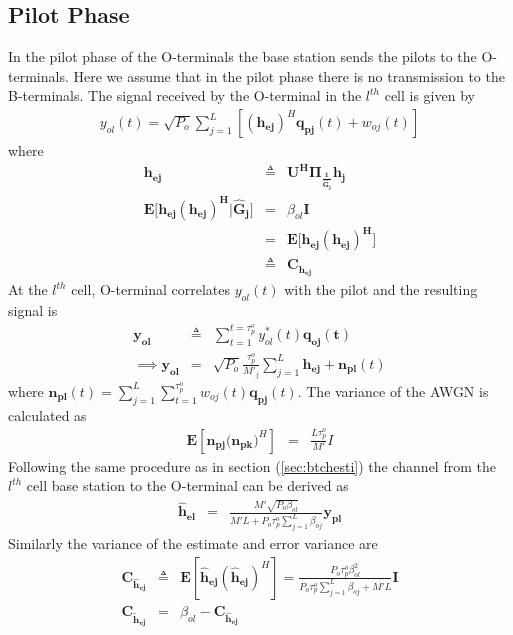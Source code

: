 \documentclass[10pt, a4paper, twoside,fleqn]{article}
\begin{document}
\subsection{Pilot Phase}
	In the pilot phase of the O-terminals the base station sends the pilots to the O-terminals. Here we assume that in the pilot phase there is no transmission to the B-terminals.
The signal received by the O-terminal in the $l^{th}$ cell is given by
\begin{eqnarray}
	y_{ol}(t)=\sqrt{P_o} \sum_{j=1}^{L} \left[(\mathbf{h_{ej}})^H \mathbf{q_{pj}}(t) + w_{oj}(t) \right]
\end{eqnarray}
where
\begin{eqnarray}
	\mathbf{h_{ej}} &\triangleq& \mathbf{U^H\Pi_{\frac{1}{\hat G_j}}h_j} \nonumber \\
        \mathbf{E[h_{ej}(h_{ej})^H|\hat G_j}] &=& \beta_{ol}\mathbf{I} \nonumber \\
			                     &=& \mathbf{E[h_{ej}(h_{ej})^H}] \nonumber \\
                                           &\triangleq& \mathbf{C_{h_{ej}}} \nonumber
\end{eqnarray}
At the $l^{th}$ cell, O-terminal correlates $y_{ol}(t)$ with the pilot and the resulting signal is
\begin{eqnarray}
	\mathbf{y_{ol}} &\triangleq& \sum_{t=1}^{t=\tau_p^o} y_{ol}^*(t)\mathbf{q_{oj}(t)} \nonumber \\
\implies \mathbf{y_{ol}} &=& \sqrt{P_o}\frac{\tau_p^o}{M'_j}\sum_{j=1}^{L}\mathbf{h_{ej}}+\mathbf{n_{pl}}(t)
\end{eqnarray}
where $\mathbf{n_{pl}}(t) = \sum_{j=1}^{L} \sum_{t=1}^{\tau_p^o} w_{oj}(t) \mathbf{q_{pj}}(t)$. The variance of the AWGN is calculated as
\begin{eqnarray*}
	\mathbf{E}[\mathbf{n_{pj}(n_{pk}})^H] &=& \frac{L\tau_p^o}{M'}I 
\end{eqnarray*}
Following the same procedure as in section (\ref{sec:btchesti}) the channel from the $l^{th}$ cell base station to the O-terminal can be derived as 
\begin{eqnarray}\label{eqn:otchesti}
	\mathbf{\hat h_{el}} &=& \frac{M'\sqrt{P_o\beta_{ol}}}{M'L+P_o\tau_p^o\sum_{j=1}^{L}\beta_{oj}}\mathbf{y_{pl}}
\end{eqnarray}
Similarly the variance of the estimate and error variance are
\begin{eqnarray}
	\mathbf{C_{\hat h_{ej}}} &\triangleq& \mathbf{E}[\mathbf{\hat h_{ej}}(\mathbf{\hat h_{ej}})^H] = \frac{P_o\tau_p^o\beta^2_{ol}}{P_o\tau_p^o\sum_{j=1}^{L}\beta_{oj}+M'L}\mathbf{I} \\
	\mathbf{C_{\widetilde{h}_{ej}}} &=& \beta_{ol} - \mathbf{C_{\hat h_{ej}}} 
\end{eqnarray}
\end{document}
